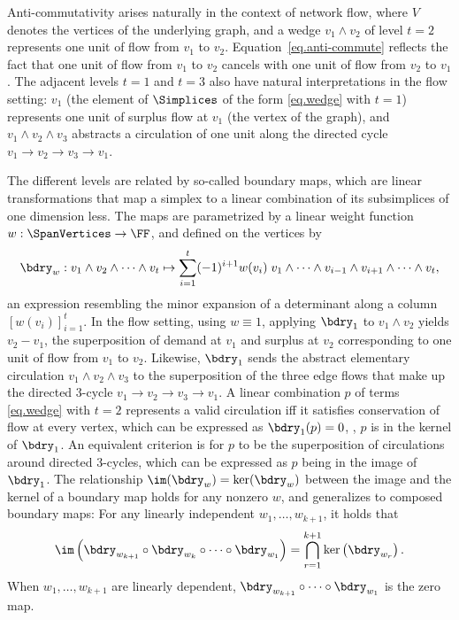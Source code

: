 \documentclass{toc}
\begin{document}
Anti-commutativity arises naturally in the context of network flow,
where $V$ denotes the vertices of the underlying graph,
and a wedge $v_1 \wedge v_2$  of level $t=2$ represents one unit of flow from
$v_1$ to $v_2$.
Equation~\eqref{eq.anti-commute} reflects the fact that one unit of flow
from $v_1$ to $v_2$ cancels with one unit of flow from $v_2$ to $v_1$.
The adjacent levels $t=1$ and $t=3$ also have natural interpretations in the
flow setting:
$v_1$ (the element of $\Simplices$ of the form \eqref{eq.wedge} with $t=1$) represents
one unit of surplus flow at $v_1$ (the vertex of the graph),
and $v_1 \wedge v_2 \wedge v_3$ abstracts a circulation of one
unit along the directed cycle $v_1 \to v_2 \to v_3 \to v_1$.

The different levels are related by so-called boundary maps, which are linear transformations that map a simplex to a linear
combination of its subsimplices of one dimension less.
The maps are parametrized by a linear weight function $w: \SpanVertices \to \FF$,
and defined on the vertices by
\begin{equation}\label{eq.boundary}
  \bdry_w:
  v_1 \wedge v_2 \wedge \dots \wedge v_t
  \mapsto
  \sum_{i=1}^t
    (-1)^{i+1}
    w(v_i) \;
    v_1 \wedge \dots \wedge v_{i-1} \wedge v_{i+1} \wedge \dots \wedge v_t,
\end{equation}
an expression resembling the minor expansion of a determinant along a column
$[ w(v_i) ]_{i=1}^t$.
In the flow setting,
using $w \equiv 1$,
applying \(\bdry_1\) to \(v_1 \wedge v_2\)
yields $v_2 - v_1$, the superposition of demand at $v_1$
and surplus at $v_2$ corresponding to one unit of flow from $v_1$ to $v_2$.
Likewise, $\bdry_1$ sends the abstract elementary circulation
\(v_1 \wedge v_2 \wedge v_3\) to the superposition of the three edge flows
that make up the directed 3-cycle $v_1\to v_2 \to v_3 \to v_1$. 
A linear combination $p$ of terms \eqref{eq.wedge} with $t=2$ represents a
valid circulation iff it satisfies conservation of flow at every vertex,
which can be expressed as $\bdry_1(p)=0$,
\ie, $p$ is in the kernel of $\bdry_1$.
An equivalent criterion is for $p$ to be the superposition of
circulations around directed 3-cycles,
which can be expressed as $p$ being in the image of $\bdry_1$.
The relationship $\im(\bdry_w) = \ker(\bdry_w)$ between the image and the kernel of a boundary map holds for any nonzero $w$, and generalizes to composed boundary maps:
For any linearly independent \(w_1, \ldots, w_{k+1}\), it holds that
\begin{equation}\label{eq.image.kernel}
  \im\left(
    \bdry_{w_{k+1}} \circ \bdry_{w_{k} }\circ \dots \circ \bdry_{w_1}
  \right)
  =
  \bigcap_{r=1}^{k+1} \ker\left( \bdry_{w_r} \right).
\end{equation}
When \(w_1, \ldots, w_{k+1}\) are linearly dependent, \(\bdry_{w_{k+1}} \circ \dots \circ \bdry_{w_1}\) is the zero map.
\end{document}
